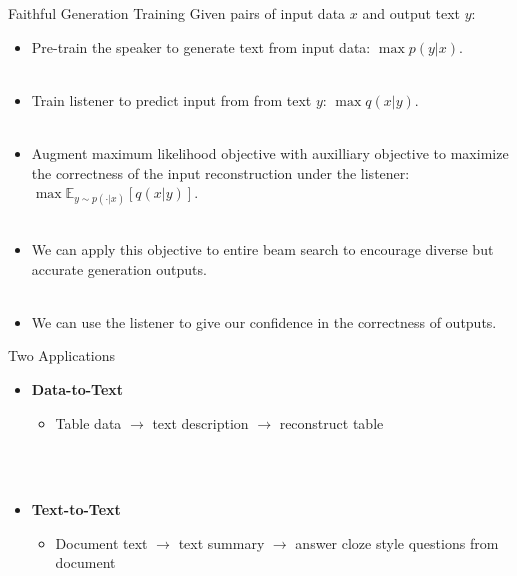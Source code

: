\begin{frame}{Faithful Generation Training}
    Given pairs of input data $x$ and output text $y$: ~\\
    \begin{itemize}
        \item<1-> Pre-train the speaker to generate text from 
            input data: \alert{$\max p(y|x)$}.~\\~\\
        \item<2-> Train listener to predict input from from text $y$: \alert{$\max q(x|y)$}.~\\~\\
        \item<3-> Augment maximum likelihood objective with auxilliary objective
       to maximize the correctness of the input reconstruction under the
            listener: \alert{$\max \mathbb{E}_{y\sim p(\cdot|x)}[ q(x|y)]$}.~\\~\\

\item<4-> We can apply this objective to entire beam search to encourage diverse but accurate generation outputs. ~\\~\\
\item<5-> We can use the listener to give our confidence in the correctness of outputs.
    \end{itemize}

\end{frame}


\begin{frame}{Two Applications}

    \begin{itemize}
        \item \textbf{Data-to-Text}
            \begin{itemize}
                \item Table data $\rightarrow$ text description $\rightarrow$ reconstruct table 
            \end{itemize} 
            ~\\~\\
        \item \textbf{Text-to-Text}
            \begin{itemize}
                \item Document text $\rightarrow$ text summary $\rightarrow$ answer cloze style questions from document
            \end{itemize}
    \end{itemize}

\end{frame}

